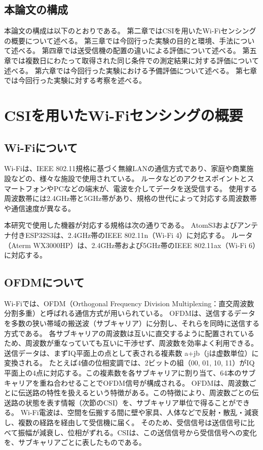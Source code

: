 \documentclass[uplatex, 12pt]{ujbook}
\begin{document}
\section{本論文の構成}
本論文の構成は以下のとおりである。
第二章ではCSIを用いたWi-Fiセンシングの概要について述べる。
第三章では今回行った実験の目的と環境、手法について述べる。
第四章では送受信機の配置の違いによる評価について述べる。
第五章では複数日にわたって取得された同じ条件での測定結果に対する評価について述べる。
第六章では今回行った実験における予備評価について述べる。
第七章では今回行った実験に対する考察を述べる。
\chapter{CSIを用いたWi-Fiセンシングの概要}
\section{Wi-Fiについて}
Wi-Fiは、IEEE 802.11規格に基づく無線LANの通信方式であり、家庭や商業施設などの、様々な施設で使用されている。
ルータなどのアクセスポイントとスマートフォンやPCなどの端末が、電波を介してデータを送受信する。
使用する周波数帯には2.4GHz帯と5GHz帯があり、規格の世代によって対応する周波数帯や通信速度が異なる。

本研究で使用した機器が対応する規格は次の通りである。
AtomS3およびアンテナ付きESP32S3は、2.4GHz帯のIEEE 802.11n（Wi-Fi 4）に対応する。
ルータ（Aterm WX3000HP）は、2.4GHz帯および5GHz帯のIEEE 802.11ax（Wi-Fi 6）に対応する。
\section{OFDMについて}
Wi-Fiでは、OFDM（Orthogonal Frequency Division Multiplexing：直交周波数分割多重）と呼ばれる通信方式が用いられている。
OFDMは、送信するデータを多数の狭い帯域の搬送波（サブキャリア）に分割し、それらを同時に送信する方式である。
各サブキャリアの周波数は互いに直交するように配置されているため、周波数が重なっていても互いに干渉せず、周波数を効率よく利用できる。
送信データは、まずIQ平面上の点として表される複素数 a+jb（jは虚数単位）に変換される。
たとえば4値の位相変調では、2ビットの組（00, 01, 10, 11）がIQ平面上の4点に対応する。この複素数を各サブキャリアに割り当て、64本のサブキャリアを重ね合わせることでOFDM信号が構成される。\cite{OFDM}
OFDMは、周波数ごとに伝送路の特性を扱えるという特徴がある。この特徴により、周波数ごとの伝送路の状態を表す情報（次節のCSI）を、サブキャリア単位で得ることができる。
Wi-Fi電波は、空間を伝搬する間に壁や家具、人体などで反射・散乱・減衰し、複数の経路を経由して受信機に届く。
そのため、受信信号は送信信号に比べて振幅が減衰し、位相がずれる。CSIは、この送信信号から受信信号への変化を、サブキャリアごとに表したものである。
\end{document}
